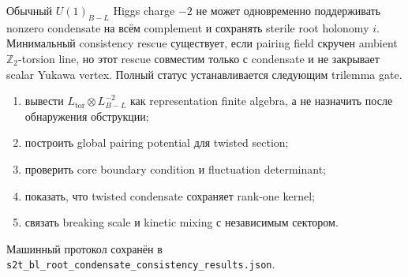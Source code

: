 \begin{proposition}
Обычный \(U(1)_{B-L}\) Higgs charge \(-2\) не может одновременно
поддерживать nonzero condensate на всём complement и сохранять sterile
root holonomy \(i\). Минимальный consistency rescue существует, если
pairing field скручен ambient \(\mathbb Z_2\)-torsion line, но этот rescue
совместим только с condensate и не закрывает scalar Yukawa vertex. Полный
статус устанавливается следующим trilemma gate.
\end{proposition}

\begin{protocol}
\begin{enumerate}
 \item вывести \(L_{\mathrm{tor}}\otimes L_{B-L}^{-2}\) как representation
 finite algebra, а не назначить после обнаружения обструкции;
 \item построить global pairing potential для twisted section;
 \item проверить core boundary condition и fluctuation determinant;
 \item показать, что twisted condensate сохраняет rank-one kernel;
 \item связать breaking scale и kinetic mixing с независимым сектором.
\end{enumerate}
\end{protocol}

Машинный протокол сохранён в
\texttt{s2t\_bl\_root\_condensate\_consistency\_results.json}.